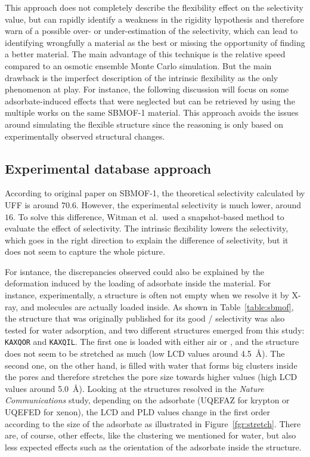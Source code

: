 \documentclass[main]{subfiles}
\begin{document}
This approach does not completely describe the flexibility effect on the selectivity value, but can rapidly identify a weakness in the rigidity hypothesis and therefore warn of a possible over- or under-estimation of the selectivity, which can lead to identifying wrongfully a material as the best or missing the opportunity of finding a better material. The main advantage of this technique is the relative speed compared to an osmotic ensemble Monte Carlo simulation.\autocite{Bousquet2012} But the main drawback is the imperfect description of the intrinsic flexibility as the only phenomenon at play. For instance, the following discussion will focus on some adsorbate-induced effects that were neglected but can be retrieved by using the multiple works on the same SBMOF-1 material. This approach avoids the issues around simulating the flexible structure since the reasoning is only based on experimentally observed structural changes. 


\subsection{Experimental database approach}

According to original paper on SBMOF-1,\autocite{Banerjee_2016} the theoretical selectivity calculated by UFF is around $70.6$. However, the experimental selectivity is much lower, around $16$. To solve this difference, Witman et al.\ used a snapshot-based method to evaluate the effect of selectivity. The intrinsic flexibility lowers the selectivity, which goes in the right direction to explain the difference of selectivity, but it does not seem to capture the whole picture. 

For isntance, the discrepancies observed could also be explained by the deformation induced by the loading of adsorbate inside the material. For instance, experimentally, a structure is often not empty when we resolve it by X-ray, and molecules are actually loaded inside. As shown in Table~\ref{table:sbmof}, the structure that was originally published for its good / selectivity\autocite{Yeh2012,Banerjee2012} was also tested for water adsorption, and two different structures emerged from this study: \texttt{KAXQOR} and \texttt{KAXQIL}. The first one is loaded with either air or , and the structure does not seem to be stretched as much (low LCD values around \SI{4.5}{\angstrom}). The second one, on the other hand, is filled with water that forms big clusters inside the pores and therefore stretches the pore size towards higher values (high LCD values around \SI{5.0}{\angstrom}). Looking at the structures resolved in the \emph{Nature Communications} study\autocite{Banerjee_2016}, depending on the adsorbate (UQEFAZ for krypton or UQEFED for xenon), the LCD and PLD values change in the first order according to the size of the adsorbate as illustrated in Figure~\ref{fgr:stretch}. There are, of course, other effects, like the clustering we mentioned for water, but also less expected effects such as the orientation of the adsorbate inside the structure. 
\end{document}
